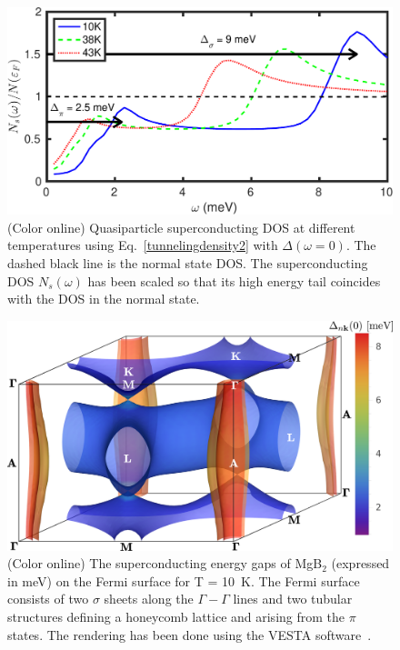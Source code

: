 \documentclass[final,3p,times,twocolumn]{elsarticle}
\newcounter{bla}
\begin{document}
\begin{figure}[t!]
  \centering
  \includegraphics[width=0.99\linewidth]{MgB2_tunnel.pdf}
  \caption{\label{tunnel-MgB2} (Color online) Quasiparticle superconducting DOS at different temperatures using Eq.~\eqref{tunnelingdensity2} with $\Delta(\omega=0)$. The dashed black line is the normal state DOS. The superconducting DOS $N_s(\omega)$ has been scaled so that its high energy tail coincides with the DOS in the normal state.}
\end{figure}


\begin{figure}[t!]
  \centering
  \includegraphics[width=0.99\linewidth]{MgB2_FS_band1and2.pdf}
  \caption{\label{FS-MgB2} (Color online) The superconducting energy gaps of MgB$_2$ (expressed in meV) on the Fermi surface for T = 10~K. The Fermi surface consists of two $\sigma$ sheets along the $\Gamma-\Gamma$ lines and two tubular structures defining a honeycomb lattice and arising from the $\pi$ states. The rendering has been done using the VESTA software~\cite{Momma2011}.}
\end{figure}
\end{document}
